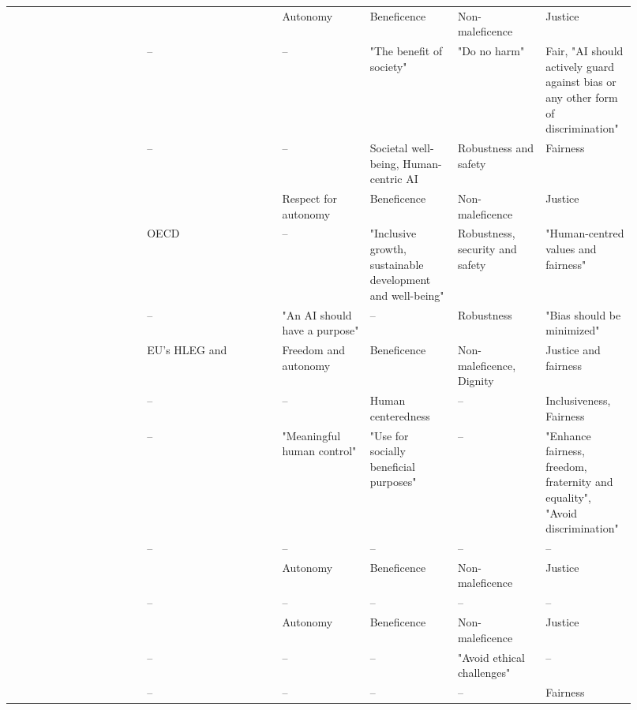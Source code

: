 \begin{landscape}
\begin{ThreePartTable}
\begin{longtable}{P{0.2\linewidth}P{0.2\linewidth}P{0.13\linewidth}P{0.13\linewidth}P{0.13\linewidth}P{0.13\linewidth}}
        \textcite{Morley_2021} & \textcite{Floridi_2018} & Autonomy & Beneficence & Non-maleficence & Justice \\ 
        \textcite{Nauck_2019} & -- & -- & "The benefit of society" & "Do no harm" & Fair, "AI should \mbox{actively} guard against bias or any other form of discrimination" \\ 
        \textcite{Papagiannidis_2022} & -- & -- & Societal well-being, Human-centric AI & Robustness and safety & Fairness \\ 
        \textcite{Peters_2020} & \textcite{Floridi_2018} & Respect for autonomy & Beneficence & Non-maleficence & Justice \\ 
        \textcite{Rizinski_2022} & OECD & -- & "Inclusive growth, sustainable development and well-being" & Robustness, security and safety & "Human-centred values and fairness" \\ 
        \textcite{Rothenberger_2019} & -- & "An AI should have a purpose" & -- & Robustness & "Bias should be \mbox{minimized}" \\ 
        \textcite{Ryan_2021} & EU's HLEG and \textcite{Jobin_2019} & Freedom and autonomy & Beneficence & Non-maleficence, \mbox{Dignity} & Justice and fairness \\ 
        \textcite{Siala_2022} & -- & -- & Human centeredness & -- & Inclusiveness, Fairness \\ 
        \textcite{Thelisson_2018} & -- & "Meaningful human control" & "Use for socially \mbox{beneficial} purposes" & -- & "Enhance fairness, freedom, fraternity and equality", "Avoid discrimination" \\ 
        \textcite{Vakkuri_2022} & -- & -- & -- & -- & -- \\ 
        \textcite{vanBruxvoort_2021} & \textcite{Floridi_2018} & Autonomy & Beneficence & Non-maleficence & Justice \\ 
        \textcite{Vetro_2019} & -- & -- & -- & -- & -- \\ 
        \textcite{WangW_2021} & \textcite{Floridi_2018} & Autonomy & Beneficence & Non-maleficence & Justice \\ 
        \textcite{WangY_2020} & -- & -- & -- & "Avoid ethical \mbox{challenges}" & -- \\ 
        \textcite{Werder_2022} & -- & -- & -- & -- & Fairness \\ 


\end{longtable}
\end{ThreePartTable}
\end{landscape}
